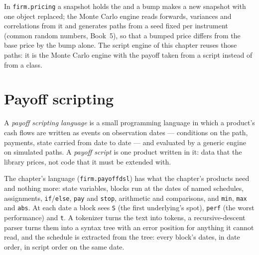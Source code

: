 In \texttt{firm.pricing} a snapshot holds the  and a bump makes a new snapshot with one object replaced; the Monte Carlo engine
reads forwards, variances and correlations from it and generates paths from a seed fixed per instrument (common random numbers, Book~5), so
that a bumped price differs from the base price by the bump alone. The script engine of this chapter reuses those paths: it is the Monte Carlo
engine with the payoff taken from a script instead of from a class.

\section{Payoff scripting}

\begin{definition}\label{def:pl:pricing-library-architecture:script}
A \emph{payoff scripting language} is a small programming language in which a product's cash flows are
written as events on observation dates --- conditions on the path, payments, state carried from date to date --- and evaluated by a generic
engine on simulated paths. A \emph{payoff script} is one product written in it: data that the library prices, not code
that it must be extended with.
\end{definition}

The chapter's language (\texttt{firm.payoffdsl}) has what the chapter's products need and nothing more: state variables, blocks run at the
dates of named schedules, assignments, \texttt{if}/\texttt{else}, \texttt{pay} and \texttt{stop}, arithmetic and comparisons, and
\texttt{min}, \texttt{max} and \texttt{abs}. At each date a block sees \texttt{S} (the first underlying's spot), \texttt{perf} (the worst
performance) and \texttt{t}. A tokenizer turns the text into tokens, a recursive-descent parser turns them into a syntax tree with an error
position for anything it cannot read, and the schedule is extracted from the tree: every block's dates, in date order, in script order on the
same date.


